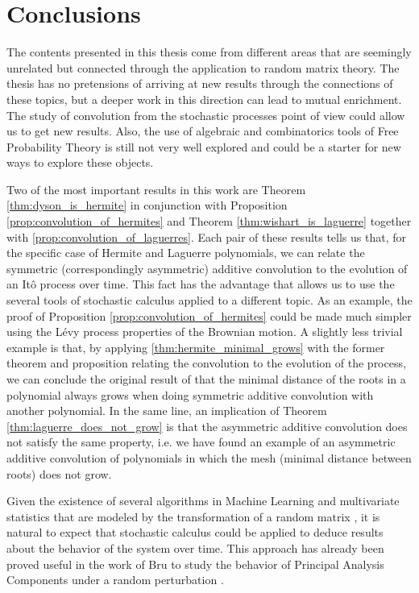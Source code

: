 \chapter*{Conclusions}

The contents presented in this thesis come from different areas that are seemingly unrelated but connected through the application to random matrix theory. The thesis has no pretensions of arriving at new results through the connections of these topics, but a deeper work in this direction can lead to mutual enrichment. The study of convolution from the stochastic processes point of view could allow us to get new results. Also, the use of algebraic and combinatorics tools of Free Probability Theory is still not very well explored and could be a starter for new ways to explore these objects.

Two of the most important results in this work are Theorem \ref{thm:dyson_is_hermite} in conjunction with Proposition \ref{prop:convolution_of_hermites} and Theorem \ref{thm:wishart_is_laguerre} together with \ref{prop:convolution_of_laguerres}. Each pair of these results tells us that, for the specific case of Hermite and Laguerre polynomials, we can relate the symmetric (correspondingly asymmetric) additive convolution to the evolution of an Itô process over time. This fact has the advantage that allows us to use the several tools of stochastic calculus applied to a different topic. As an example, the proof of Proposition \ref{prop:convolution_of_hermites}  could be made much simpler using the Lévy process properties of the Brownian motion. A slightly less trivial example is that, by applying \ref{thm:hermite_minimal_grows} with the former theorem and proposition relating the convolution to the evolution of the process, we can conclude the original result of \cite{article:roots_grow_polya} that the minimal distance of the roots in a polynomial always grows when doing symmetric additive convolution with another polynomial. In the same line, an implication of Theorem \ref{thm:laguerre_does_not_grow} is that the asymmetric additive convolution does not satisfy the same property, i.e. we have found an example of an asymmetric additive convolution of polynomials in which the mesh (minimal distance between roots) does not grow.

Given the existence of several algorithms in Machine Learning and multivariate statistics that are modeled by the transformation of a random matrix \cite{pmlr-v70-pennington17a,srivastava2002methods}, it is natural to expect that stochastic calculus could be applied to deduce results about the behavior of the system over time. This approach has already been proved useful in the work of Bru to study the behavior of Principal Analysis Components under a random perturbation \cite{bru1989diffusions}.

